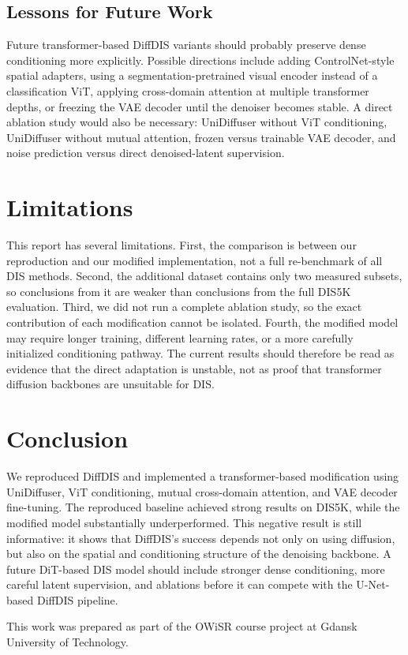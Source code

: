 \documentclass[sigconf,nonacm]{acmart}
\begin{document}
\subsection{Lessons for Future Work}
Future transformer-based DiffDIS variants should probably preserve dense conditioning more explicitly. Possible directions include adding ControlNet-style spatial adapters, using a segmentation-pretrained visual encoder instead of a classification ViT, applying cross-domain attention at multiple transformer depths, or freezing the VAE decoder until the denoiser becomes stable. A direct ablation study would also be necessary: UniDiffuser without ViT conditioning, UniDiffuser without mutual attention, frozen versus trainable VAE decoder, and noise prediction versus direct denoised-latent supervision.

\section{Limitations}
This report has several limitations. First, the comparison is between our reproduction and our modified implementation, not a full re-benchmark of all DIS methods. Second, the additional dataset contains only two measured subsets, so conclusions from it are weaker than conclusions from the full DIS5K evaluation. Third, we did not run a complete ablation study, so the exact contribution of each modification cannot be isolated. Fourth, the modified model may require longer training, different learning rates, or a more carefully initialized conditioning pathway. The current results should therefore be read as evidence that the direct adaptation is unstable, not as proof that transformer diffusion backbones are unsuitable for DIS.

\section{Conclusion}
We reproduced DiffDIS and implemented a transformer-based modification using UniDiffuser, ViT conditioning, mutual cross-domain attention, and VAE decoder fine-tuning. The reproduced baseline achieved strong results on DIS5K, while the modified model substantially underperformed. This negative result is still informative: it shows that DiffDIS's success depends not only on using diffusion, but also on the spatial and conditioning structure of the denoising backbone. A future DiT-based DIS model should include stronger dense conditioning, more careful latent supervision, and ablations before it can compete with the U-Net-based DiffDIS pipeline.

\begin{acks}
This work was prepared as part of the OWiSR course project at Gdansk University of Technology.
\end{acks}



\end{document}
